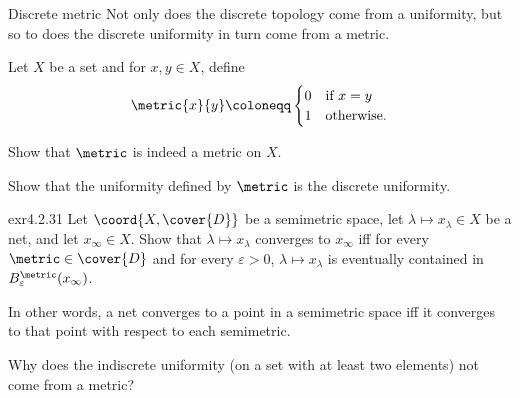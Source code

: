 \begin{exm}{Discrete metric}{}
Not only does the discrete topology come from a uniformity, but so to does the discrete uniformity in turn come from a metric.

Let $X$ be a set and for $x,y\in X$, define
\begin{equation}
\metric{x}{y}\coloneqq \begin{cases}0 & \text{if }x=y \\ 1 & \text{otherwise.}\end{cases}
\end{equation}
\begin{exr}[breakable=false]{}{}
Show that $\metric$ is indeed a metric on $X$.
\end{exr}
\begin{exr}[breakable=false]{}{}
Show that the uniformity defined by $\metric$ is the discrete uniformity.
\end{exr}
\end{exm}
\begin{exr}{}{exr4.2.31}
Let $\coord{X,\cover{D}}$ be a semimetric space, let $\lambda \mapsto x_\lambda \in X$ be a net, and let $x_{\infty}\in X$.  Show that $\lambda \mapsto x_\lambda$ converges to $x_{\infty}$ iff for every $\metric \in \cover{D}$ and for every $\varepsilon >0$, $\lambda \mapsto x_\lambda$ is eventually contained in $B_{\varepsilon}^{\metric}(x_{\infty})$.
\begin{rmk}
In other words, a net converges to a point in a semimetric space iff it converges to that point with respect to each semimetric.
\end{rmk}
\end{exr}
\begin{exr}{}{}
Why does the indiscrete uniformity (on a set with at least two elements) not come from a metric?
\end{exr}


